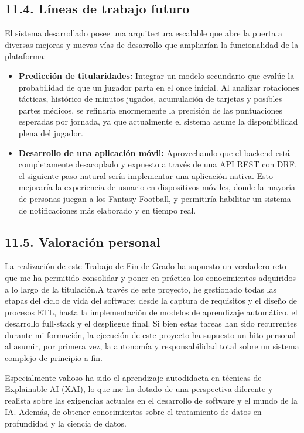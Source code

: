 \subsection{11.4. Líneas de trabajo futuro}

El sistema desarrollado posee una arquitectura escalable que abre la puerta a diversas mejoras y nuevas vías de desarrollo que ampliarían la funcionalidad de la plataforma:
\begin{itemize}
    \item \textbf{Predicción de titularidades:} Integrar un modelo secundario que evalúe la probabilidad de que un jugador parta en el once inicial. Al analizar rotaciones tácticas, histórico de minutos jugados, acumulación de tarjetas y posibles partes médicos, se refinaría enormemente la precisión de las puntuaciones esperadas por jornada, ya que actualmente el sistema asume la disponibilidad plena del jugador.
    \item \textbf{Desarrollo de una aplicación móvil:} Aprovechando que el backend está completamente desacoplado y expuesto a través de una API REST con DRF, el siguiente paso natural sería implementar una aplicación nativa. Esto mejoraría la experiencia de usuario en dispositivos móviles, donde la mayoría de personas juegan a los Fantasy Football, y permitiría habilitar un sistema de notificaciones más elaborado y en tiempo real.
\end{itemize}

\subsection{11.5. Valoración personal}

La realización de este Trabajo de Fin de Grado ha supuesto un verdadero reto que me ha permitido consolidar y poner en práctica los conocimientos adquiridos a lo largo de la titulación.A través de este proyecto, he gestionado todas las etapas del ciclo de vida del software: desde la captura de requisitos y el diseño de procesos ETL, hasta la implementación de modelos de aprendizaje automático, el desarrollo full-stack y el despliegue final. Si bien estas tareas han sido recurrentes durante mi formación, la ejecución de este proyecto ha supuesto un hito personal al asumir, por primera vez, la autonomía y responsabilidad total sobre un sistema complejo de principio a fin.

Especialmente valioso ha sido el aprendizaje autodidacta en técnicas de Explainable AI (XAI), lo que me ha dotado de una perspectiva diferente y realista sobre las exigencias actuales en el desarrollo de software y el mundo de la IA. Además, de obtener conocimientos sobre el tratamiento de datos en profundidad y la ciencia de datos.